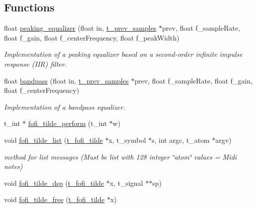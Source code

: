 \subsection*{Functions}
\begin{DoxyCompactItemize}
\item 
float \mbox{\hyperlink{fofi~_8c_aa9833aa2762cf257e25d13fb21b004b0}{peaking\+\_\+equalizer}} (float in, \mbox{\hyperlink{fofi~_8h_a728138bbe23514a1927f1f686090cd52}{t\+\_\+prev\+\_\+samples}} $\ast$prev, float f\+\_\+sample\+Rate, float f\+\_\+gain, float f\+\_\+center\+Frequency, float f\+\_\+peak\+Width)
\begin{DoxyCompactList}\small\item\em Implementation of a peaking equalizer based on a second-\/order infinite impulse response (I\+IR) filter. \end{DoxyCompactList}\item 
float \mbox{\hyperlink{fofi~_8c_a79bf4da8324cab6a31c4439c746821d8}{bandpass}} (float in, \mbox{\hyperlink{fofi~_8h_a728138bbe23514a1927f1f686090cd52}{t\+\_\+prev\+\_\+samples}} $\ast$prev, float f\+\_\+sample\+Rate, float f\+\_\+gain, float f\+\_\+center\+Frequency)
\begin{DoxyCompactList}\small\item\em Implementation of a bandpass equalizer. \end{DoxyCompactList}\item 
t\+\_\+int $\ast$ \mbox{\hyperlink{fofi~_8c_addff81b941469be60d263c2df0493f50}{fofi\+\_\+tilde\+\_\+perform}} (t\+\_\+int $\ast$w)
\item 
void \mbox{\hyperlink{fofi~_8c_a83449b8d535886ef9d7ecd42146932c3}{fofi\+\_\+tilde\+\_\+list}} (\mbox{\hyperlink{fofi~_8h_a9d4d0a864b5185ebc589d41112da08ce}{t\+\_\+fofi\+\_\+tilde}} $\ast$x, t\+\_\+symbol $\ast$s, int argc, t\+\_\+atom $\ast$argv)
\begin{DoxyCompactList}\small\item\em method for list messages (Must be list with 128 integer \char`\"{}atom\char`\"{} values = Midi notes) \end{DoxyCompactList}\item 
void \mbox{\hyperlink{fofi~_8c_aff2a8eab6867563a3613be7a34908bb2}{fofi\+\_\+tilde\+\_\+dsp}} (\mbox{\hyperlink{fofi~_8h_a9d4d0a864b5185ebc589d41112da08ce}{t\+\_\+fofi\+\_\+tilde}} $\ast$x, t\+\_\+signal $\ast$$\ast$sp)
\item 
void \mbox{\hyperlink{fofi~_8c_a5e4884d6f16289cbd823f619ca55c44a}{fofi\+\_\+tilde\+\_\+free}} (\mbox{\hyperlink{fofi~_8h_a9d4d0a864b5185ebc589d41112da08ce}{t\+\_\+fofi\+\_\+tilde}} $\ast$x)
$$
\end{DoxyCompactItemize}
